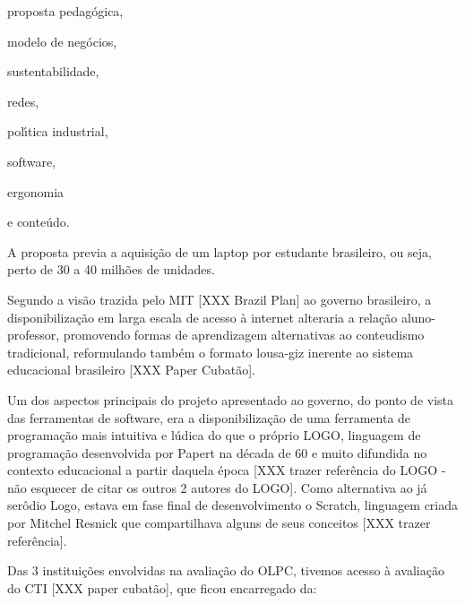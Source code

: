 \documentclass[
12pt,		%
openright,	%
twoside,  %
a4paper,			%
chapter=TITLE,		%
english,			%
french,				%
spanish,			%
brazil				%
]{USPSC-classe/USPSC}
\begin{document}
\begin{alineas}
\item proposta pedag\'ogica,
\item modelo de neg\'ocios,
\item sustentabilidade,
\item redes,
\item pol\'{\i}tica industrial,
\item software,
\item ergonomia
\item e conte\'udo.
\end{alineas}

A proposta previa a aquisi\c{c}\~ao de um \textquotedbl laptop por estudante brasileiro, ou seja, perto de 30 a 40 milh\~oes de unidades.


Segundo a vis\~ao trazida pelo MIT [XXX Brazil Plan] ao governo brasileiro, a disponibiliza\c{c}\~ao em larga escala de acesso \`a internet alteraria a rela\c{c}\~ao aluno-professor, promovendo formas de aprendizagem alternativas ao conteudismo tradicional, reformulando tamb\'em o formato lousa-giz inerente ao sistema educacional brasileiro [XXX Paper Cubat\~ao].


Um dos aspectos principais do projeto apresentado ao governo, do ponto de vista das ferramentas de software, era a disponibiliza\c{c}\~ao de uma ferramenta de programa\c{c}\~ao mais intuitiva e l\'udica do que o pr\'oprio LOGO, linguagem de programa\c{c}\~ao desenvolvida por Papert na d\'ecada de 60 e muito difundida no contexto educacional a partir daquela \'epoca [XXX trazer refer\^encia do LOGO - n\~ao esquecer de citar os outros 2 autores do LOGO]. Como alternativa ao j\'a ser\^odio Logo, estava em fase final de desenvolvimento o Scratch, linguagem criada por Mitchel Resnick que compartilhava alguns de seus conceitos [XXX trazer refer\^encia].


Das 3 institui\c{c}\~oes envolvidas na avalia\c{c}\~ao do OLPC, tivemos acesso \`a avalia\c{c}\~ao do CTI [XXX paper cubat\~ao], que ficou encarregado da:
\end{document}
